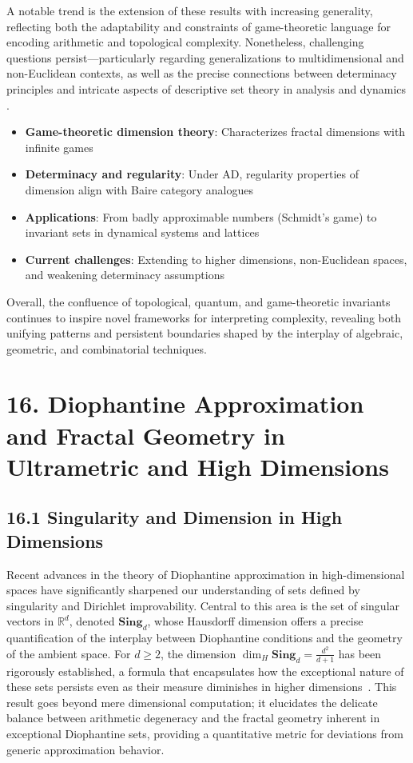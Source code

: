 \documentclass[11pt]{article}
\begin{document}
A notable trend is the extension of these results with increasing generality, reflecting both the adaptability and constraints of game-theoretic language for encoding arithmetic and topological complexity. Nonetheless, challenging questions persist—particularly regarding generalizations to multidimensional and non-Euclidean contexts, as well as the precise connections between determinacy principles and intricate aspects of descriptive set theory in analysis and dynamics \cite{ref80}.

\begin{itemize}
    \item \textbf{Game-theoretic dimension theory}: Characterizes fractal dimensions with infinite games
    \item \textbf{Determinacy and regularity}: Under AD, regularity properties of dimension align with Baire category analogues
    \item \textbf{Applications}: From badly approximable numbers (Schmidt's game) to invariant sets in dynamical systems and lattices
    \item \textbf{Current challenges}: Extending to higher dimensions, non-Euclidean spaces, and weakening determinacy assumptions
\end{itemize}

Overall, the confluence of topological, quantum, and game-theoretic invariants continues to inspire novel frameworks for interpreting complexity, revealing both unifying patterns and persistent boundaries shaped by the interplay of algebraic, geometric, and combinatorial techniques.

\section{16. Diophantine Approximation and Fractal Geometry in Ultrametric and High Dimensions}

\subsection{16.1 Singularity and Dimension in High Dimensions}

Recent advances in the theory of Diophantine approximation in high-dimensional spaces have significantly sharpened our understanding of sets defined by singularity and Dirichlet improvability. Central to this area is the set of singular vectors in $\mathbb{R}^d$, denoted $\mathbf{Sing}_d$, whose Hausdorff dimension offers a precise quantification of the interplay between Diophantine conditions and the geometry of the ambient space. For $d \geq 2$, the dimension $\dim_H \mathbf{Sing}_d = \frac{d^2}{d+1}$ has been rigorously established, a formula that encapsulates how the exceptional nature of these sets persists even as their measure diminishes in higher dimensions~\cite{ref109}. This result goes beyond mere dimensional computation; it elucidates the delicate balance between arithmetic degeneracy and the fractal geometry inherent in exceptional Diophantine sets, providing a quantitative metric for deviations from generic approximation behavior.
\end{document}
